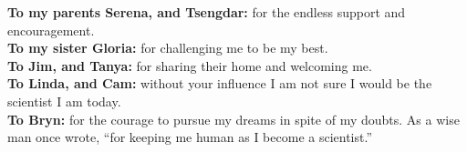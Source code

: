 %
\begin{frontmatter}

%
%
\makefrontmatter

%
%
%
%
%
%



\begin{mydedication} %
  \begin{flushleft}
  \vspace{1cm}
  \textbf{To my parents Serena, and Tsengdar:} for the endless support and encouragement.\\
  \textbf{To my sister Gloria:} for challenging me to be my best.\\[1cm]
  \textbf{To Jim, and Tanya:} for sharing their home and welcoming me.\\[1cm]
  \textbf{To Linda, and Cam:} without your influence I am not sure I would be the scientist I am today.\\[3cm]
  \textbf{To Bryn:} for the courage to pursue my dreams in spite of my doubts. As a wise man once wrote, ``for keeping me human as I become a scientist.''
  \end{flushleft}
\end{mydedication}



%
%

%



\end{frontmatter}
